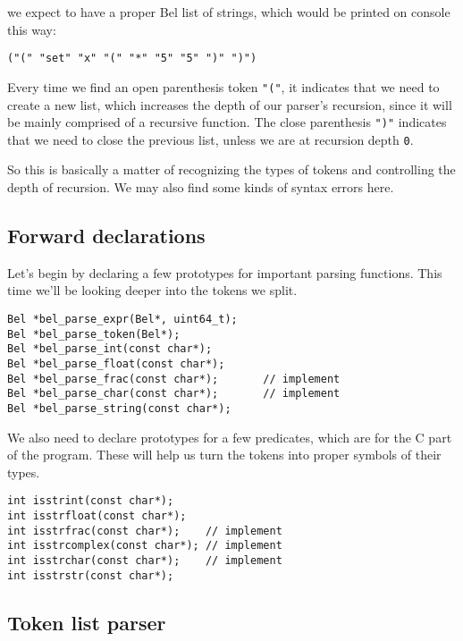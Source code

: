 \documentclass[openright,a4paper,twoside,12pt]{memoir}
\begin{document}
we expect to have a proper Bel list of strings, which would be printed
on console this way:

\begin{verbatim}
("(" "set" "x" "(" "*" "5" "5" ")" ")")
\end{verbatim}

Every time we find an open parenthesis token \texttt{"("}, it indicates that we
need to create  a new list, which increases the  depth of our parser's
recursion,  since  it   will  be  mainly  comprised   of  a  recursive
function. The  close parenthesis \texttt{")"}  indicates that we need  to close
the previous list, unless we are at recursion depth \texttt{0}.

So this is  basically a matter of recognizing the  types of tokens and
controlling the  depth of recursion.  We may  also find some  kinds of
syntax errors here.

\subsection{Forward declarations}
\label{sec:orgbacd3da}

Let's  begin  by declaring  a  few  prototypes for  important  parsing
functions. This time we'll be looking deeper into the tokens we split.

\begin{verbatim}
Bel *bel_parse_expr(Bel*, uint64_t);
Bel *bel_parse_token(Bel*);
Bel *bel_parse_int(const char*);
Bel *bel_parse_float(const char*);
Bel *bel_parse_frac(const char*);       // implement
Bel *bel_parse_char(const char*);       // implement
Bel *bel_parse_string(const char*);
\end{verbatim}

We also need to declare prototypes for a few predicates, which are for
the C  part of the  program. These will help  us turn the  tokens into
proper symbols of their types.

\begin{verbatim}
int isstrint(const char*);
int isstrfloat(const char*);
int isstrfrac(const char*);    // implement
int isstrcomplex(const char*); // implement
int isstrchar(const char*);    // implement
int isstrstr(const char*);
\end{verbatim}

\subsection{Token list parser}
\label{sec:org535a8f9}
\end{document}

